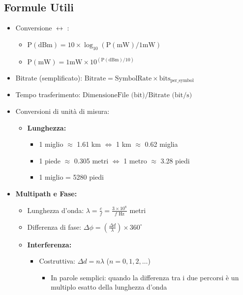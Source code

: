 \subsection{Formule Utili}
\begin{itemize}
    \item Conversione  $\leftrightarrow$ :
    \begin{itemize}
        \item $\text{P}(\text{dBm}) = 10 \times \log_{10}( \text{P}(\text{mW}) / 1\text{mW} )$
        \item $\text{P}(\text{mW}) = 1\text{mW} \times 10^{( \text{P}(\text{dBm}) / 10 )}$
    \end{itemize}
    \item Bitrate (semplificato): $\text{Bitrate} = \text{SymbolRate} \times \text{bits}_{\text{per\_symbol}}$
    \item Tempo trasferimento: $\text{DimensioneFile (bit)} / \text{Bitrate (bit/s)}$
    \item Conversioni di unità di misura:
    \begin{itemize}
        \item \textbf{Lunghezza:}
        \begin{itemize}
            \item 1 miglio $\approx$ 1.61 km $\Longleftrightarrow$ 1 km $\approx$ 0.62 miglia
            \item 1 piede $\approx$ 0.305 metri $\Longleftrightarrow$ 1 metro $\approx$ 3.28 piedi
            \item 1 miglio = 5280 piedi
        \end{itemize}
    \end{itemize}
    \item \textbf{Multipath e Fase:}
    \begin{itemize}
        \item Lunghezza d'onda: $\lambda = \frac{c}{f} = \frac{3 \times 10^8}{f \text{ Hz}}$ metri
        \item Differenza di fase: $\Delta\phi = \left( \frac{\Delta d}{\lambda} \right) \times 360^\circ$
        \item \textbf{Interferenza:}
        \begin{itemize}
            \item Costruttiva: $\Delta d = n\lambda$ ($n = 0,1,2,\ldots$)
            \begin{itemize}
                \item In parole semplici: quando la differenza tra i due percorsi è un multiplo esatto della lunghezza d'onda

\end{itemize}
\end{itemize}
\end{itemize}
\end{itemize}
